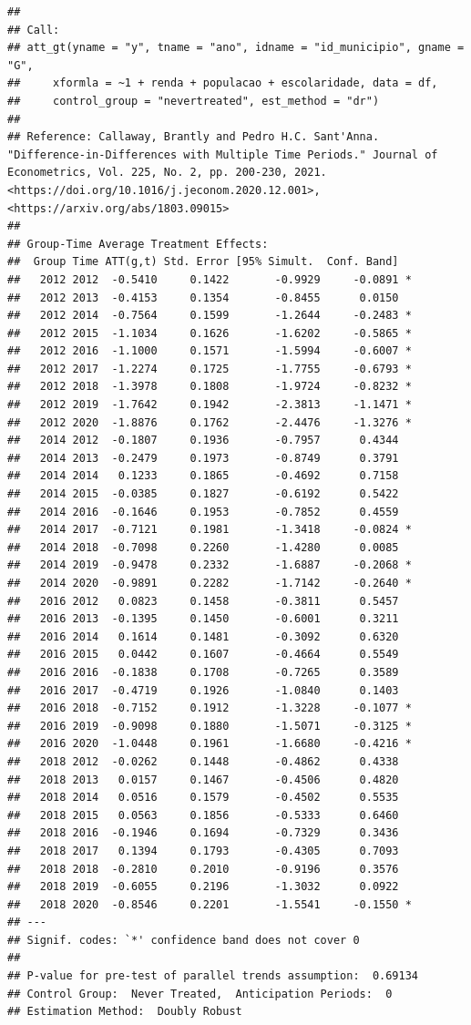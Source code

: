 \documentclass[
]{article}
\begin{document}
\begin{verbatim}
## 
## Call:
## att_gt(yname = "y", tname = "ano", idname = "id_municipio", gname = "G", 
##     xformla = ~1 + renda + populacao + escolaridade, data = df, 
##     control_group = "nevertreated", est_method = "dr")
## 
## Reference: Callaway, Brantly and Pedro H.C. Sant'Anna.  "Difference-in-Differences with Multiple Time Periods." Journal of Econometrics, Vol. 225, No. 2, pp. 200-230, 2021. <https://doi.org/10.1016/j.jeconom.2020.12.001>, <https://arxiv.org/abs/1803.09015> 
## 
## Group-Time Average Treatment Effects:
##  Group Time ATT(g,t) Std. Error [95% Simult.  Conf. Band]  
##   2012 2012  -0.5410     0.1422       -0.9929     -0.0891 *
##   2012 2013  -0.4153     0.1354       -0.8455      0.0150  
##   2012 2014  -0.7564     0.1599       -1.2644     -0.2483 *
##   2012 2015  -1.1034     0.1626       -1.6202     -0.5865 *
##   2012 2016  -1.1000     0.1571       -1.5994     -0.6007 *
##   2012 2017  -1.2274     0.1725       -1.7755     -0.6793 *
##   2012 2018  -1.3978     0.1808       -1.9724     -0.8232 *
##   2012 2019  -1.7642     0.1942       -2.3813     -1.1471 *
##   2012 2020  -1.8876     0.1762       -2.4476     -1.3276 *
##   2014 2012  -0.1807     0.1936       -0.7957      0.4344  
##   2014 2013  -0.2479     0.1973       -0.8749      0.3791  
##   2014 2014   0.1233     0.1865       -0.4692      0.7158  
##   2014 2015  -0.0385     0.1827       -0.6192      0.5422  
##   2014 2016  -0.1646     0.1953       -0.7852      0.4559  
##   2014 2017  -0.7121     0.1981       -1.3418     -0.0824 *
##   2014 2018  -0.7098     0.2260       -1.4280      0.0085  
##   2014 2019  -0.9478     0.2332       -1.6887     -0.2068 *
##   2014 2020  -0.9891     0.2282       -1.7142     -0.2640 *
##   2016 2012   0.0823     0.1458       -0.3811      0.5457  
##   2016 2013  -0.1395     0.1450       -0.6001      0.3211  
##   2016 2014   0.1614     0.1481       -0.3092      0.6320  
##   2016 2015   0.0442     0.1607       -0.4664      0.5549  
##   2016 2016  -0.1838     0.1708       -0.7265      0.3589  
##   2016 2017  -0.4719     0.1926       -1.0840      0.1403  
##   2016 2018  -0.7152     0.1912       -1.3228     -0.1077 *
##   2016 2019  -0.9098     0.1880       -1.5071     -0.3125 *
##   2016 2020  -1.0448     0.1961       -1.6680     -0.4216 *
##   2018 2012  -0.0262     0.1448       -0.4862      0.4338  
##   2018 2013   0.0157     0.1467       -0.4506      0.4820  
##   2018 2014   0.0516     0.1579       -0.4502      0.5535  
##   2018 2015   0.0563     0.1856       -0.5333      0.6460  
##   2018 2016  -0.1946     0.1694       -0.7329      0.3436  
##   2018 2017   0.1394     0.1793       -0.4305      0.7093  
##   2018 2018  -0.2810     0.2010       -0.9196      0.3576  
##   2018 2019  -0.6055     0.2196       -1.3032      0.0922  
##   2018 2020  -0.8546     0.2201       -1.5541     -0.1550 *
## ---
## Signif. codes: `*' confidence band does not cover 0
## 
## P-value for pre-test of parallel trends assumption:  0.69134
## Control Group:  Never Treated,  Anticipation Periods:  0
## Estimation Method:  Doubly Robust
\end{verbatim}
\end{document}

